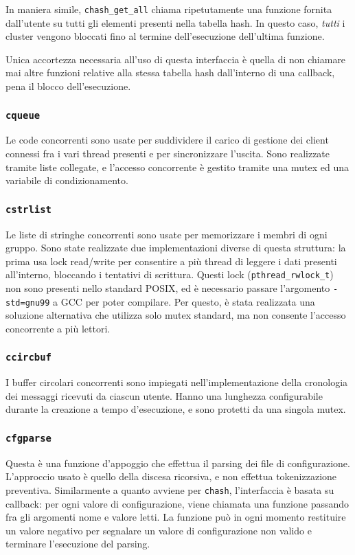 \documentclass[11pt]{article} %
\begin{document}
In maniera simile, \texttt{chash\_get\_all} chiama ripetutamente una funzione fornita dall'utente su tutti gli elementi presenti nella tabella hash. In questo caso, \textit{tutti} i cluster vengono bloccati fino al termine dell'esecuzione dell'ultima funzione.

Unica accortezza necessaria all'uso di questa interfaccia è quella di non chiamare mai altre funzioni relative alla stessa tabella hash dall'interno di una callback, pena il blocco dell'esecuzione.

\subsubsection{\texttt{cqueue}}
Le code concorrenti sono usate per suddividere il carico di gestione dei client connessi fra i vari thread presenti e per sincronizzare l'uscita. Sono realizzate tramite liste collegate, e l'accesso concorrente è gestito tramite una mutex ed una variabile di condizionamento.

\subsubsection{\texttt{cstrlist}}
Le liste di stringhe concorrenti sono usate per memorizzare i membri di ogni gruppo. Sono state realizzate due implementazioni diverse di questa struttura: la prima usa lock read/write per consentire a più thread di leggere i dati presenti all'interno, bloccando i tentativi di scrittura. Questi lock (\texttt{pthread\_rwlock\_t}) non sono presenti nello standard POSIX, ed è necessario passare l'argomento \texttt{-std=gnu99} a GCC per poter compilare. Per questo, è stata realizzata una soluzione alternativa che utilizza solo mutex standard, ma non consente l'accesso concorrente a più lettori.

\subsubsection{\texttt{ccircbuf}}
I buffer circolari concorrenti sono impiegati nell'implementazione della cronologia dei messaggi ricevuti da ciascun utente. Hanno una lunghezza configurabile durante la creazione a tempo d'esecuzione, e sono protetti da una singola mutex.

\subsubsection{\texttt{cfgparse}}
Questa è una funzione d'appoggio che effettua il parsing dei file di configurazione. L'approccio usato è quello della discesa ricorsiva, e non effettua tokenizzazione preventiva. Similarmente a quanto avviene per \texttt{chash}, l'interfaccia è basata su callback: per ogni valore di configurazione, viene chiamata una funzione passando fra gli argomenti nome e valore letti. La funzione può in ogni momento restituire un valore negativo per segnalare un valore di configurazione non valido e terminare l'esecuzione del parsing.
\end{document}

